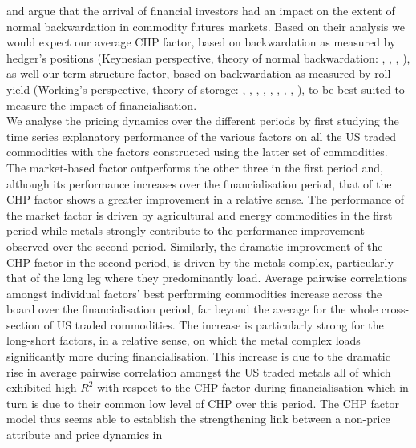 \documentclass[
  authoryear,
  preprint,
  3p]{elsarticle}
\begin{document}
\citet{goldstein_speculation_2014} and \citet{goldstein_commodity_2022}
argue that the arrival of financial investors had an impact on the
extent of normal backwardation in commodity futures markets. Based on
their analysis we would expect our average CHP factor, based on
backwardation as measured by hedger's positions (Keynesian perspective,
theory of normal backwardation: \citet{keynes_treatise_1930},
\citet{hicks_value_1939}, \citet{houthakker_speculators_1957},
\citet{telser_futures_1958}), as well our term structure factor, based
on backwardation as measured by roll yield (Working's perspective,
theory of storage: \citet{working_price_1933},
\citet{kaldor_speculation_1939}, \citet{working_theory_1948},
\citet{brennan_supply_1958}, \citet{cootner_returns_1960},
\citet{weymar_supply_1966}, \citet{danthine_information_1978},
\citet{turnovsky_determination_1983}, \citet{schwartz_stochastic_1997}),
to be best suited to measure the impact of financialisation.\\
We analyse the pricing dynamics over the different periods by first
studying the time series explanatory performance of the various factors
on all the US traded commodities with the factors constructed using the
latter set of commodities. The market-based factor outperforms the other
three in the first period and, although its performance increases over
the financialisation period, that of the CHP factor shows a greater
improvement in a relative sense. The performance of the market factor is
driven by agricultural and energy commodities in the first period while
metals strongly contribute to the performance improvement observed over
the second period. Similarly, the dramatic improvement of the CHP factor
in the second period, is driven by the metals complex, particularly that
of the long leg where they predominantly load. Average pairwise
correlations amongst individual factors' best performing commodities
increase across the board over the financialisation period, far beyond
the average for the whole cross-section of US traded commodities. The
increase is particularly strong for the long-short factors, in a
relative sense, on which the metal complex loads significantly more
during financialisation. This increase is due to the dramatic rise in
average pairwise correlation amongst the US traded metals all of which
exhibited high \(R^{2}\) with respect to the CHP factor during
financialisation which in turn is due to their common low level of CHP
over this period. The CHP factor model thus seems able to establish the
strengthening link between a non-price attribute and price dynamics in
\end{document}
